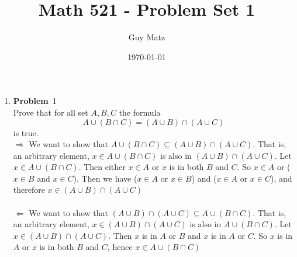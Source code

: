 \documentclass[12pt]{amsart}
\title{\textbf{Math 521 - Problem Set 1}}
\author{Guy Matz}
\date{\today}
\theoremstyle{definition}
\newcommand{\itep}{\item {\bfseries Problem}\ }
\begin{document}
 

\maketitle
\newpage %

\begin{enumerate}[series=p]
\itep 1
\\
Prove that for all set $A, B, C$ the formula
$$A \cup (B \cap C) = (A \cup B) \cap (A \cup C)$$
is true.
\\
$\Rightarrow$ We want to show that $A \cup (B \cap C) \subseteq (A \cup B) \cap (A \cup C)$.  That is, an arbitrary element, $x \in A \cup (B \cap C)$ is also in $(A \cup B) \cap (A \cup C)$.  Let $x \in A \cup(B \cap C)$.  Then either $x \in A$ or $x$ is in both $B$ and $C$.  So $x \in A$ or ($x \in B$ and $x \in C$).  Then we have ($x \in A$ or $x \in B$) and ($x \in A$ or $x \in C$), and therefore $x \in (A \cup B) \cap (A \cup C)$
\\\\
$\Leftarrow$ We want to show that $(A \cup B) \cap (A \cup C) \subseteq A \cup (B \cap C)$.  That is, an arbitrary element, $x \in (A \cup B) \cap (A \cup C)$ is also in $A \cup (B \cap C)$.  Let $x \in (A \cup B) \cap (A \cup C)$.  Then $x$ is in $A$ or $B$ and $x$ is in $A$ or $C$.  So $x$ is in $A$ or $x$ is in both $B$ and $C$, hence $x \in A \cup (B \cap C)$
\newpage %


\end{enumerate}
\end{document}
